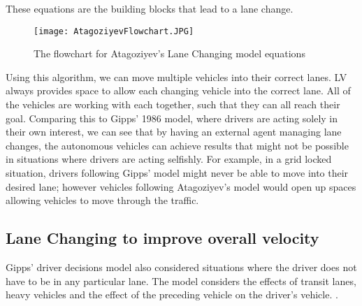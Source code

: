 These equations are the building blocks that lead to a lane change. 

\begin{figure}[htb]
\texttt{[image: AtagoziyevFlowchart.JPG]}
\caption{The flowchart for Atagoziyev's Lane Changing model equations}
\label{fig:AtogoziyevFlowchart}
\end{figure}

Using this algorithm, we can move multiple vehicles into their correct lanes. LV always provides space to allow each changing vehicle into the correct lane. All of the vehicles are working with each together, such that they can all reach their goal. Comparing this to Gipps' 1986 model, where drivers are acting solely in their own interest, we can see that by having an external agent managing lane changes, the autonomous vehicles can achieve results that might not be possible in situations where drivers are acting selfishly. For example, in a grid locked situation, drivers following Gipps' model might never be able to move into their desired lane; however vehicles following Atagoziyev's model would open up spaces allowing vehicles to move through the traffic.

\subsection{Lane Changing to improve overall velocity}
\label{subsec:Lane Changing to improve overall velocity}
Gipps' driver decisions model also considered situations where the driver does not have to be in any particular lane. The model considers the effects of transit lanes, heavy vehicles and the effect of the preceding vehicle on the driver's vehicle. .

